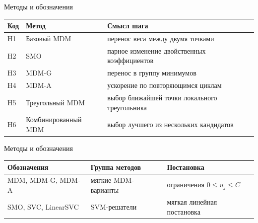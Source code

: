 \SPBGContentSlide
  {Методы и обозначения}
  {%
    \centering
    \SmallBody
    \renewcommand{\arraystretch}{1.08}
    \begin{tabularx}{.95\linewidth}{@{}l>{\raggedright\arraybackslash}X>{\raggedright\arraybackslash}X@{}}
      \toprule
      Код & Метод & Смысл шага \\
      \midrule
      H1 & Базовый MDM & перенос веса между двумя точками \\
      H2 & SMO & парное изменение двойственных коэффициентов \\
      H3 & MDM-G & перенос в группу минимумов \\
      H4 & MDM-A & ускорение по повторяющимся циклам \\
      H5 & Треугольный MDM & выбор ближайшей точки локального треугольника \\
      H6 & Комбинированный MDM & выбор лучшего из нескольких кандидатов \\
      \bottomrule
    \end{tabularx}
  }

\SPBGContentSlide
  {Методы и обозначения}
  {%
    \centering
    \SmallBody
    \renewcommand{\arraystretch}{1.15}
    \begin{tabularx}{.95\linewidth}{@{}>{\raggedright\arraybackslash}X>{\raggedright\arraybackslash}X>{\raggedright\arraybackslash}X@{}}
      \toprule
      Обозначения & Группа методов & Постановка \\
      \midrule
      MDM, MDM-G, MDM-A & мягкие MDM-варианты & ограничения $0\leq u_j\leq C$ \\
      SMO, SVC, LinearSVC & SVM-решатели & мягкая линейная постановка \\
      \bottomrule
    \end{tabularx}
  }
